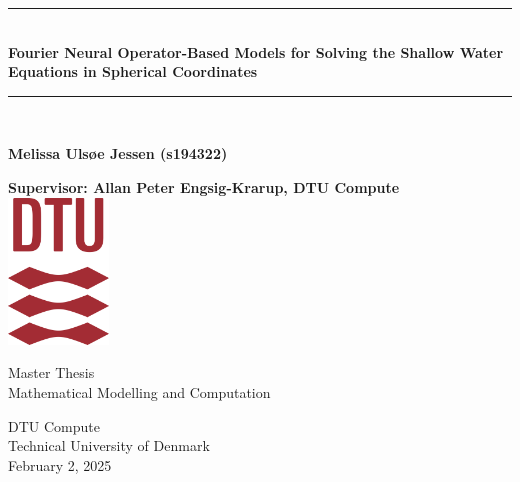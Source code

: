 \begin{titlepage}
\newcommand{\HRule}{\rule{\linewidth}{0.5mm}} 


    \begin{center}
        
        \HRule\\[0.4cm]
        
        {\huge\bfseries Fourier Neural Operator-Based Models for Solving the Shallow Water Equations in Spherical Coordinates}\\[0.4cm]
        


        \HRule\\[1.5cm]
 


        \vspace{1.1cm}
 
        \textbf{Melissa Ulsøe Jessen (s194322)}
        
        \vspace{1.1cm}
 
        \textbf{Supervisor: Allan Peter Engsig-Krarup,  DTU Compute}\\

             
        \vspace{1.5cm}
        \includegraphics[width=0.2\textwidth]{figs/DTU.png}
             
         \vspace{1cm}
             
         Master Thesis\\
         Mathematical Modelling and Computation\\   
         
         \vfill
             
        DTU Compute\\
        Technical University of Denmark\\
        February 2, 2025
             
    \end{center}
 \end{titlepage}

